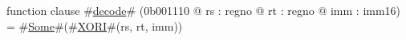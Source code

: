 function clause #\hyperref[zdecode]{decode}# (0b001110 @ rs : regno @ rt : regno @ imm : imm16) =
  #\hyperref[zSome]{Some}#(#\hyperref[zXORI]{XORI}#(rs, rt, imm))
